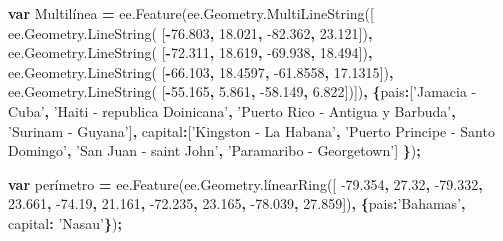 \documentclass[
]{article}
\newenvironment{Shaded}{\begin{snugshade}}{\end{snugshade}}
\newcommand{\AttributeTok}[1]{\textcolor[rgb]{0.77,0.63,0.00}{#1}}
\newcommand{\DataTypeTok}[1]{\textcolor[rgb]{0.13,0.29,0.53}{#1}}
\newcommand{\FloatTok}[1]{\textcolor[rgb]{0.00,0.00,0.81}{#1}}
\newcommand{\KeywordTok}[1]{\textcolor[rgb]{0.13,0.29,0.53}{\textbf{#1}}}
\newcommand{\NormalTok}[1]{#1}
\newcommand{\OperatorTok}[1]{\textcolor[rgb]{0.81,0.36,0.00}{\textbf{#1}}}
\newcommand{\StringTok}[1]{\textcolor[rgb]{0.31,0.60,0.02}{#1}}
\newcommand{\VariableTok}[1]{\textcolor[rgb]{0.00,0.00,0.00}{#1}}
\begin{document}
\begin{Shaded}
\begin{Highlighting}[]
\KeywordTok{var}\NormalTok{ Multilínea }\OperatorTok{=} \VariableTok{ee}\NormalTok{.}\AttributeTok{Feature}\NormalTok{(}\VariableTok{ee}\NormalTok{.}\VariableTok{Geometry}\NormalTok{.}\AttributeTok{MultiLineString}\NormalTok{([  }
   \VariableTok{ee}\NormalTok{.}\VariableTok{Geometry}\NormalTok{.}\AttributeTok{LineString}\NormalTok{(                      }
\NormalTok{     [}\OperatorTok{-}\FloatTok{76.803}\OperatorTok{,} \FloatTok{18.021}\OperatorTok{,} \FloatTok{-82.362}\OperatorTok{,} \FloatTok{23.121}\NormalTok{])}\OperatorTok{,}      
  \VariableTok{ee}\NormalTok{.}\VariableTok{Geometry}\NormalTok{.}\AttributeTok{LineString}\NormalTok{(                       }
\NormalTok{    [}\OperatorTok{-}\FloatTok{72.311}\OperatorTok{,} \FloatTok{18.619}\OperatorTok{,} \FloatTok{-69.938}\OperatorTok{,} \FloatTok{18.494}\NormalTok{])}\OperatorTok{,}        
  \VariableTok{ee}\NormalTok{.}\VariableTok{Geometry}\NormalTok{.}\AttributeTok{LineString}\NormalTok{(                       }
\NormalTok{    [}\OperatorTok{-}\FloatTok{66.103}\OperatorTok{,} \FloatTok{18.4597}\OperatorTok{,} \FloatTok{-61.8558}\OperatorTok{,} \FloatTok{17.1315}\NormalTok{])}\OperatorTok{,}
  \VariableTok{ee}\NormalTok{.}\VariableTok{Geometry}\NormalTok{.}\AttributeTok{LineString}\NormalTok{(}
\NormalTok{    [}\OperatorTok{-}\FloatTok{55.165}\OperatorTok{,} \FloatTok{5.861}\OperatorTok{,} \FloatTok{-58.149}\OperatorTok{,} \FloatTok{6.822}\NormalTok{])])}\OperatorTok{,}
    \OperatorTok{\{}\DataTypeTok{pais}\OperatorTok{:}\NormalTok{[}\StringTok{'Jamacia - Cuba'}\OperatorTok{,}
    \StringTok{'Haiti - republica Doinicana'}\OperatorTok{,}
    \StringTok{'Puerto Rico - Antigua y Barbuda'}\OperatorTok{,}
    \StringTok{'Surinam - Guyana'}\NormalTok{]}\OperatorTok{,}
    \DataTypeTok{capital}\OperatorTok{:}\NormalTok{[}\StringTok{'Kingston - La Habana'}\OperatorTok{,}
    \StringTok{'Puerto Principe - Santo Domingo'}\OperatorTok{,}
    \StringTok{'San Juan - saint John'}\OperatorTok{,}
    \StringTok{'Paramaribo - Georgetown'}\NormalTok{]}
    \OperatorTok{\}}\NormalTok{)}\OperatorTok{;}

\KeywordTok{var}\NormalTok{ perímetro }\OperatorTok{=} \VariableTok{ee}\NormalTok{.}\AttributeTok{Feature}\NormalTok{(}\VariableTok{ee}\NormalTok{.}\VariableTok{Geometry}\NormalTok{.}\AttributeTok{línearRing}\NormalTok{([  }
  \FloatTok{-79.354}\OperatorTok{,} \FloatTok{27.32}\OperatorTok{,}
  \FloatTok{-79.332}\OperatorTok{,} \FloatTok{23.661}\OperatorTok{,}
  \FloatTok{-74.19}\OperatorTok{,} \FloatTok{21.161}\OperatorTok{,}
  \FloatTok{-72.235}\OperatorTok{,} \FloatTok{23.165}\OperatorTok{,}
  \FloatTok{-78.039}\OperatorTok{,} \FloatTok{27.859}\NormalTok{])}\OperatorTok{,}
    \OperatorTok{\{}\DataTypeTok{pais}\OperatorTok{:}\StringTok{'Bahamas'}\OperatorTok{,} \DataTypeTok{capital}\OperatorTok{:} \StringTok{'Nasau'}\OperatorTok{\}}\NormalTok{)}\OperatorTok{;}


\end{Highlighting}
\end{Shaded}
\end{document}

